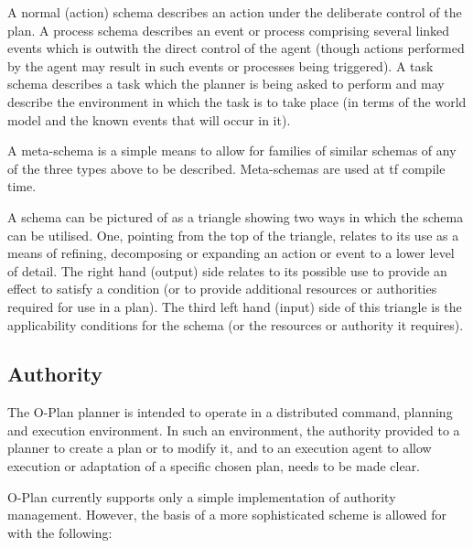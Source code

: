 A normal (action) schema describes an action under the deliberate control of
the plan.  A process schema describes an event or process comprising several
linked events which is outwith the direct control of the agent (though actions
performed by the agent may result in such events or processes being
triggered).  A task schema describes a task which the planner is being asked
to perform and may describe the environment in which the task is to take place
(in terms of the world model and the known events that will occur in it).

A meta-schema is a simple means to allow for families of similar schemas of
any of the three types above to be described.  Meta-schemas are used
at {\sc tf} compile time.

A schema can be pictured of as a triangle showing two ways in which the schema
can be utilised.  One, pointing from the top of the triangle, relates to its
use as a means of refining, decomposing or expanding an action or event to a
lower level of detail.  The right hand (output) side relates to its possible
use to provide an effect to satisfy a condition (or to provide additional
resources or authorities required for use in a plan).  The third left hand
(input) side of this triangle is the applicability conditions for the schema
(or the resources or authority it requires).


\begin{center}

\end{center}

\subsection{Authority}

The O-Plan planner is intended to operate in a distributed command, planning
and execution environment. In such an environment, the authority provided to a
planner to create a plan or to modify it, and to an execution agent to allow
execution or adaptation of a specific chosen plan, needs to be made clear.

O-Plan currently supports only a simple implementation of authority
management.  However, the basis of a more sophisticated scheme is
allowed for with the following:

